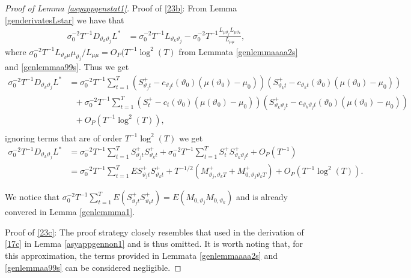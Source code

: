 {{\begin{proof}[Proof of Lemma \ref{asyappgenstat1}]
Proof of \eqref{23b}: From Lemma \ref{genderivatesLstar} we have that 
\begin{align*}
   \sigma_0^{-2} T^{-1} D_{\vartheta_k \vartheta_j } L^* &= \sigma_0^{-2} T^{-1} L_{\vartheta_k  \vartheta_j} -  \sigma_0^{-2} T^{-1} \frac{L_{\mu \vartheta_j} L_{\mu \vartheta_k}}{L_{\mu \mu} },
\end{align*}
where  $\sigma_0^{-2} T^{-1} L_{\vartheta_k \mu}\mu_{\vartheta_j}/L_{\mu \mu} = O_P(T^{-1}\log^2(T)$ from Lemmata \ref{genlemmaaaa2s} and \ref{genlemmaa99s}. Thus we get 
\begin{align*}
     \sigma_0^{-2} T^{-1} D_{\vartheta_k \vartheta_j } L^* &=  \sigma_0^{-2} T^{-1} \sum_{t = 1}^T \left( S_{\vartheta_j t}^+ -  c_{\vartheta_j t}(\vartheta_0)\left(\mu(\vartheta_0)-\mu_0\right)\right) \left( S_{\vartheta_k t}^+ -  c_{\vartheta_k t}(\vartheta_0)\left(\mu(\vartheta_0)-\mu_0\right)\right) \\
    &\ \ \ +  \sigma_0^{-2} T^{-1}  \sum_{t = 1}^T  \left(S_{t}^+ - c_{t}(\vartheta_0)\left(\mu(\vartheta_0)-\mu_0\right)\right) \left( S_{ \vartheta_k  \vartheta_j t}^+ -  c_{\vartheta_k  \vartheta_j t}(\vartheta_0)\left(\mu(\vartheta_0)-\mu_0\right)\right) \\
    &\ \ \ +  O_P(T^{-1} \log^2(T) ), \\
\end{align*}
ignoring terms that are of order $T^{-1} \log^2(T)$ we get
\begin{align*}
 \sigma_0^{-2} T^{-1} D_{\vartheta_k \vartheta_j } L^* &= \sigma_0^{-2} T^{-1} \sum_{t = 1}^T S_{\vartheta_j t}^+ S_{\vartheta_k t}^+ + \sigma_0^{-2} T^{-1} \sum_{t = 1}^T S_{t}^+ S_{ \vartheta_k  \vartheta_j t}^+ +   O_P(T^{-1}) \\
 &= \sigma_0^{-2} T^{-1} \sum_{t = 1}^T E S_{\vartheta_j t}^+ S_{\vartheta_k t}^+ + T^{-1/2} \left( M^+_{\vartheta_j,\vartheta_k T} + M^+_{0,\vartheta_j \vartheta_k T}\right) +  O_P(T^{-1} \log^2(T)).
\end{align*}

We notice that $\sigma_0^{-2} T^{-1} \sum_{t = 1}^T E  \left( S_{\vartheta_j t}^+ S_{\vartheta_k t}^+ \right)  = E \left( M_{0,\vartheta_j} M_{0,\vartheta_k} \right)$ and is already convered in Lemma \ref{genlemmma1}.

Proof of \eqref{23c}: The proof strategy closely resembles that used in the derivation of \eqref{17c} in Lemma \ref{asyappgennon1} and is thus omitted. It is worth noting that, for this approximation, the terms provided in Lemmata \ref{genlemmaaaa2s} and \ref{genlemmaa99s} can be considered negligible.






\end{proof}}}

